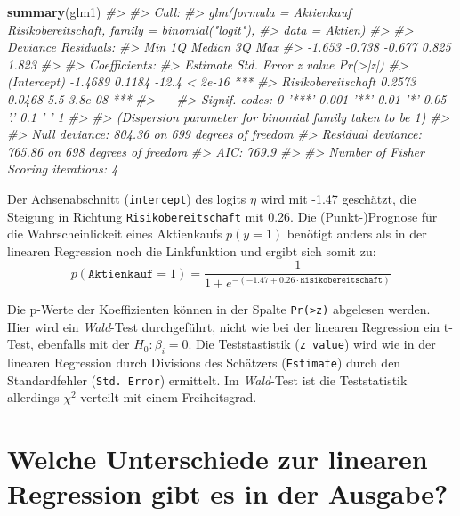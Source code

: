 \documentclass[12pt,ngerman,]{book}
\newenvironment{Shaded}{\begin{snugshade}}{\end{snugshade}}
\newcommand{\KeywordTok}[1]{\textcolor[rgb]{0.13,0.29,0.53}{\textbf{{#1}}}}
\newcommand{\CommentTok}[1]{\textcolor[rgb]{0.56,0.35,0.01}{\textit{{#1}}}}
\newcommand{\NormalTok}[1]{{#1}}
\renewenvironment{Shaded}{\begin{kframe}}{\end{kframe}}
\begin{document}
\begin{Shaded}
\begin{Highlighting}[]
\KeywordTok{summary}\NormalTok{(glm1)}
\CommentTok{#> }
\CommentTok{#> Call:}
\CommentTok{#> glm(formula = Aktienkauf ~ Risikobereitschaft, family = binomial("logit"), }
\CommentTok{#>     data = Aktien)}
\CommentTok{#> }
\CommentTok{#> Deviance Residuals: }
\CommentTok{#>    Min      1Q  Median      3Q     Max  }
\CommentTok{#> -1.653  -0.738  -0.677   0.825   1.823  }
\CommentTok{#> }
\CommentTok{#> Coefficients:}
\CommentTok{#>                    Estimate Std. Error z value Pr(>|z|)    }
\CommentTok{#> (Intercept)         -1.4689     0.1184   -12.4  < 2e-16 ***}
\CommentTok{#> Risikobereitschaft   0.2573     0.0468     5.5  3.8e-08 ***}
\CommentTok{#> ---}
\CommentTok{#> Signif. codes:  0 '***' 0.001 '**' 0.01 '*' 0.05 '.' 0.1 ' ' 1}
\CommentTok{#> }
\CommentTok{#> (Dispersion parameter for binomial family taken to be 1)}
\CommentTok{#> }
\CommentTok{#>     Null deviance: 804.36  on 699  degrees of freedom}
\CommentTok{#> Residual deviance: 765.86  on 698  degrees of freedom}
\CommentTok{#> AIC: 769.9}
\CommentTok{#> }
\CommentTok{#> Number of Fisher Scoring iterations: 4}
\end{Highlighting}
\end{Shaded}

Der Achsenabschnitt (\texttt{intercept}) des logits \(\eta\) wird mit
-1.47 geschätzt, die Steigung in Richtung \texttt{Risikobereitschaft}
mit 0.26. Die (Punkt-)Prognose für die Wahrscheinlickeit eines
Aktienkaufs \(p(y=1)\) benötigt anders als in der linearen Regression
noch die Linkfunktion und ergibt sich somit zu:
\[p(\texttt{Aktienkauf}=1)=\frac{1}{1+e^{-(-1.47 + 0.26 \cdot \texttt{Risikobereitschaft})}}\]

Die p-Werte der Koeffizienten können in der Spalte
\texttt{Pr(\textgreater{}\textbar{}z\textbar{})} abgelesen werden. Hier
wird ein \emph{Wald}-Test durchgeführt, nicht wie bei der linearen
Regression ein t-Test, ebenfalls mit der \(H_0:\beta_i=0\). Die
Teststastistik (\texttt{z\ value}) wird wie in der linearen Regression
durch Divisions des Schätzers (\texttt{Estimate}) durch den
Standardfehler (\texttt{Std.\ Error}) ermittelt. Im \emph{Wald}-Test ist
die Teststatistik allerdings \(\chi^2\)-verteilt mit einem
Freiheitsgrad.

\section{Welche Unterschiede zur linearen Regression gibt es in der
Ausgabe?}\label{welche-unterschiede-zur-linearen-regression-gibt-es-in-der-ausgabe}
\end{document}
